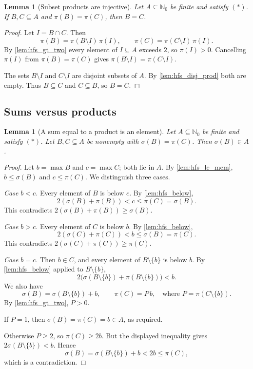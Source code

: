 \documentclass[11pt]{article}
\newtheorem{lemma}[theorem]{Lemma}
\theoremstyle{definition}
\theoremstyle{remark}
\newcommand{\Nz}{\mathbb{N}_0}
\begin{document}
\begin{lemma}[Subset products are injective]\label{lem:hfs_prod_inj}
Let $A\subseteq\Nz$ be finite and satisfy $(\ast)$. If $B,C\subseteq A$ and $\pi(B)=\pi(C)$, then $B=C$.
\end{lemma}

\begin{proof}
Let $I=B\cap C$. Then
\[
\pi(B)=\pi(B\setminus I)\,\pi(I),\qquad \pi(C)=\pi(C\setminus I)\,\pi(I).
\]
By \cref{lem:hfs_gt_two} every element of $I\subseteq A$ exceeds $2$, so $\pi(I)>0$. Cancelling $\pi(I)$ from $\pi(B)=\pi(C)$ gives $\pi(B\setminus I)=\pi(C\setminus I)$.

The sets $B\setminus I$ and $C\setminus I$ are disjoint subsets of $A$. By \cref{lem:hfs_disj_prod} both are empty. Thus $B\subseteq C$ and $C\subseteq B$, so $B=C$.
\end{proof}

\subsection{Sums versus products}

\begin{lemma}[A sum equal to a product is an element]\label{lem:hfs_sum_eq_prod}
Let $A\subseteq\Nz$ be finite and satisfy $(\ast)$. Let $B,C\subseteq A$ be nonempty with $\sigma(B)=\pi(C)$. Then $\sigma(B)\in A$.
\end{lemma}

\begin{proof}
Let $b=\max B$ and $c=\max C$; both lie in $A$. By \cref{lem:hfs_le_mem}, $b\le\sigma(B)$ and $c\le\pi(C)$. We distinguish three cases.

\emph{Case $b<c$.} Every element of $B$ is below $c$. By \cref{lem:hfs_below},
\[
2(\sigma(B)+\pi(B))<c\le\pi(C)=\sigma(B).
\]
This contradicts $2(\sigma(B)+\pi(B))\ge\sigma(B)$.

\emph{Case $b>c$.} Every element of $C$ is below $b$. By \cref{lem:hfs_below},
\[
2(\sigma(C)+\pi(C))<b\le\sigma(B)=\pi(C).
\]
This contradicts $2(\sigma(C)+\pi(C))\ge\pi(C)$.

\emph{Case $b=c$.} Then $b\in C$, and every element of $B\setminus\{b\}$ is below $b$. By \cref{lem:hfs_below} applied to $B\setminus\{b\}$,
\[
2\bigl(\sigma(B\setminus\{b\})+\pi(B\setminus\{b\})\bigr)<b .
\]
We also have
\[
\sigma(B)=\sigma(B\setminus\{b\})+b,\qquad \pi(C)=P\,b,\quad\text{where }P=\pi(C\setminus\{b\}).
\]
By \cref{lem:hfs_gt_two}, $P>0$.

If $P=1$, then $\sigma(B)=\pi(C)=b\in A$, as required.

Otherwise $P\ge2$, so $\pi(C)\ge2b$. But the displayed inequality gives $2\sigma(B\setminus\{b\})<b$. Hence
\[
\sigma(B)=\sigma(B\setminus\{b\})+b<2b\le\pi(C),
\]
which is a contradiction.
\end{proof}
\end{document}
